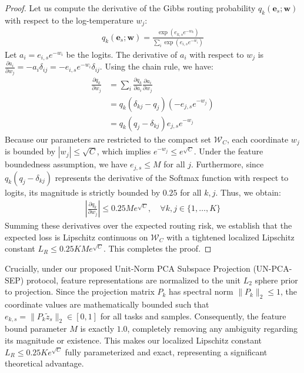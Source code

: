 \begin{proof}
Let us compute the derivative of the Gibbs routing probability $q_k(\mathbf{e}_s; \mathbf{w})$ with respect to the log-temperature $w_j$:
\begin{align}
    q_k(\mathbf{e}_s; \mathbf{w}) = \frac{\exp(e_{k, s} e^{-w_k})}{\sum_i \exp(e_{i, s} e^{-w_i})}
\end{align}
Let $a_i = e_{i, s} e^{-w_i}$ be the logits. The derivative of $a_i$ with respect to $w_j$ is $\frac{\partial a_i}{\partial w_j} = -a_i \delta_{ij} = -e_{i, s} e^{-w_i} \delta_{ij}$. Using the chain rule, we have:
\begin{align}
    \frac{\partial q_k}{\partial w_j} &= \sum_i \frac{\partial q_k}{\partial a_i} \frac{\partial a_i}{\partial w_j} \nonumber \\
    &= q_k (\delta_{kj} - q_j) (-e_{j, s} e^{-w_j}) \nonumber \\
    &= q_k (q_j - \delta_{kj}) e_{j, s} e^{-w_j}
\end{align}
Because our parameters are restricted to the compact set $\mathcal{W}_C$, each coordinate $w_j$ is bounded by $|w_j| \le \sqrt{C}$, which implies $e^{-w_j} \le e^{\sqrt{C}}$. Under the feature boundedness assumption, we have $e_{j, s} \le M$ for all $j$. Furthermore, since $q_k (q_j - \delta_{kj})$ represents the derivative of the Softmax function with respect to logits, its magnitude is strictly bounded by $0.25$ for all $k, j$. Thus, we obtain:
\begin{align}
    \left| \frac{\partial q_k}{\partial w_j} \right| \le 0.25 M e^{\sqrt{C}}, \quad \forall k, j \in \{1,\dots, K\}
\end{align}
Summing these derivatives over the expected routing risk, we establish that the expected loss is Lipschitz continuous on $\mathcal{W}_C$ with a tightened localized Lipschitz constant $L_R \le 0.25 K M e^{\sqrt{C}}$. This completes the proof.
\end{proof}

Crucially, under our proposed Unit-Norm PCA Subspace Projection (UN-PCA-SEP) protocol, feature representations are normalized to the unit $L_2$ sphere prior to projection. Since the projection matrix $P_k$ has spectral norm $\|P_k\|_2 \le 1$, the coordinate values are mathematically bounded such that $e_{k, s} = \|P_k \tilde{z}_s\|_2 \in [0, 1]$ for all tasks and samples. Consequently, the feature bound parameter $M$ is exactly $1.0$, completely removing any ambiguity regarding its magnitude or existence. This makes our localized Lipschitz constant $L_R \le 0.25 K e^{\sqrt{C}}$ fully parameterized and exact, representing a significant theoretical advantage.

